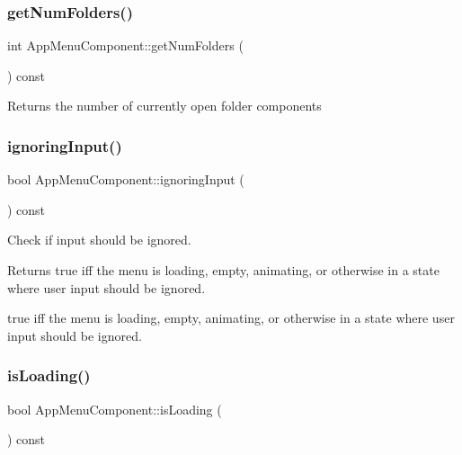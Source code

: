 \subsubsection{\texorpdfstring{get\+Num\+Folders()}{getNumFolders()}}
{\footnotesize\ttfamily int App\+Menu\+Component\+::get\+Num\+Folders (\begin{DoxyParamCaption}{ }\end{DoxyParamCaption}) const\hspace{0.3cm}{\ttfamily [protected]}}

\begin{DoxyReturn}{Returns}
the number of currently open folder components 
\end{DoxyReturn}
\mbox{\label{classAppMenuComponent_a1a74b9fcc52b97ecac24fbd95d77102e}} 
\subsubsection{\texorpdfstring{ignoring\+Input()}{ignoringInput()}}
{\footnotesize\ttfamily bool App\+Menu\+Component\+::ignoring\+Input (\begin{DoxyParamCaption}{ }\end{DoxyParamCaption}) const\hspace{0.3cm}{\ttfamily [protected]}}

Check if input should be ignored.

\begin{DoxyReturn}{Returns}
true iff the menu is loading, empty, animating, or otherwise in a state where user input should be ignored.

true iff the menu is loading, empty, animating, or otherwise in a state where user input should be ignored. 
\end{DoxyReturn}
\mbox{\label{classAppMenuComponent_a34b9d65125be02234eadd43498ae0adc}} 
\subsubsection{\texorpdfstring{is\+Loading()}{isLoading()}}
{\footnotesize\ttfamily bool App\+Menu\+Component\+::is\+Loading (\begin{DoxyParamCaption}{ }\end{DoxyParamCaption}) const}

